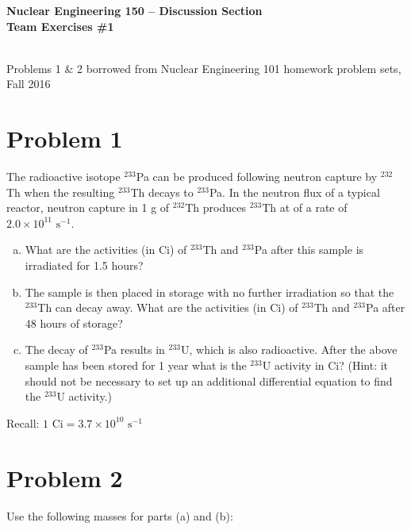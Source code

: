 \documentclass{report}
\begin{document}
\begin{center}
\textbf{\large Nuclear Engineering 150 -- Discussion Section}\\ 
\textbf{Team Exercises \#1}

\-\\
{\small *Problems 1 \& 2 borrowed from Nuclear Engineering 101 homework problem sets, Fall 2016}
\end{center}

\section*{Problem 1}
The radioactive isotope $^{233}$Pa can be produced following neutron capture by $^{232}$Th when the resulting $^{233}$Th decays to $^{233}$Pa. In the neutron flux of a typical reactor, neutron capture in 1 g of $^{232}$Th produces $^{233}$Th at of a rate of $2.0 \times 10^{11}\text{ s}^{-1}$.
\begin{enumerate}[a)]
\item What are the activities (in Ci) of $^{233}$Th and $^{233}$Pa after this sample is irradiated for 1.5 hours?
\item The sample is then placed in storage with no further irradiation so that the $^{233}$Th can decay away. What are
the activities (in Ci) of $^{233}$Th and $^{233}$Pa after 48 hours of storage?
\item The decay of $^{233}$Pa results in $^{233}$U, which is also radioactive. After the above sample has been stored for 1 year what is the $^{233}$U activity in Ci? (Hint: it should not be necessary to set up an additional differential equation to find the $^{233}$U activity.)
\end{enumerate}

Recall: $1\text{ Ci} = 3.7 \times 10^{10}\text{ s}^{-1}$



\newpage
\section*{Problem 2}

Use the following masses for parts (a) and (b):
\end{document}
